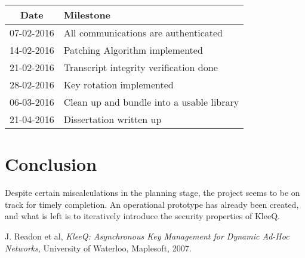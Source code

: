 \documentclass[12pt, a4paper]{article}
\begin{document}
\begin{tabular*}{0.9\textwidth}{c | l}
    Date & Milestone \\ 
    \hline
    07-02-2016 & All communications are authenticated \\
    14-02-2016 & Patching Algorithm implemented \\
    21-02-2016 & Transcript integrity verification done \\ 
    28-02-2016 & Key rotation implemented \\
    06-03-2016 & Clean up and bundle into a usable library\\
    21-04-2016 & Dissertation written up \\
\end{tabular*}


\section{Conclusion}
Despite certain miscalculations in the planning stage, the project seems to be on track for timely completion. An operational prototype has already been created, and what is left is to iteratively introduce the security properties of KleeQ.

\begin{thebibliography}{9}
    
  J. Readon et al,
  \emph{KleeQ: Asynchronous Key Management for Dynamic Ad-Hoc Networks},
  University of Waterloo, Maplesoft,
  2007.

\end{thebibliography}
\end{document}
